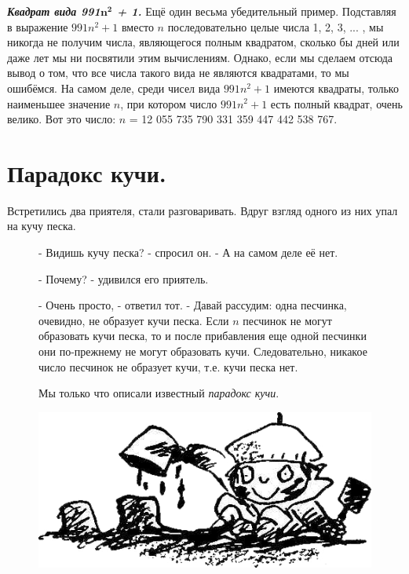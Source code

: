 \newpage

\textbf{\textit{Квадрат вида 991$\boldsymbol{n^2}$ + 1.}} Ещё один весьма убедительный пример. Подставляя в выражение $991n^2 + 1$ вместо $n$ последовательно целые числа 1, 2, 3, ... , мы никогда не получим числа, являющегося полным квадратом, сколько бы дней или даже лет мы ни посвятили этим вычислениям. Однако, если мы сделаем отсюда вывод о том, что все числа такого вида не являются квадратами, то мы ошибёмся. На самом деле, среди чисел вида $991n^2 + 1$ имеются квадраты, только наименьшее значение $n$, при котором число $991n^2 + 1$ есть полный квадрат, очень велико. Вот это число: $n$ = 12 055 735 790 331 359 447 442 538 767.

\section*{Парадокс кучи.}
Встретились два приятеля, стали разговаривать. Вдруг взгляд одного из них упал на кучу песка.

\par

\begin{figure}[H]
\begin{minipage}{0.64\linewidth}\setlength{\parindent}{1.5em}
- Видишь кучу песка? - спросил он. - А на самом деле её нет.
\par
- Почему? - удивился его приятель.
\par
- Очень просто, - ответил тот. - Давай рассудим: одна песчинка, очевидно, не образует кучи песка. Если $n$ песчинок не могут образовать кучи песка, то и после прибавления еще одной песчинки они по-прежнему не могут образовать кучи. Следовательно, никакое число песчинок не образует кучи, т.е. кучи песка нет.
\par
Мы только что описали известный \textit{парадокс кучи}.
\end{minipage}
\hfill
\begin{minipage}{0.35\linewidth}
    \includegraphics[width=0.95\columnwidth]{img/kucha.png}
\end{minipage}
\end{figure} 


